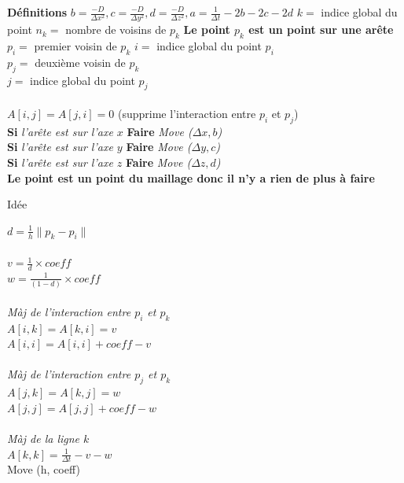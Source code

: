 \documentclass[11pt,a4paper]{article}
\begin{document}
\begin{algorithm}[H]
\SetAlgoLined
\textbf{Définitions}\;
$\displaystyle b =\frac{-D}{\Delta x^2}, c=\frac{-D}{\Delta y^2}, d=\frac{-D}{\Delta z^2}, a = \frac{1}{\Delta t} -2b-2c-2d$\;
{
	$k =$ indice global du point\;
	$n_k =$ nombre de voisins de $p_k$\;
	{
		\textbf{Le point $p_k$ est un point sur une arête}\;
		$p_i = $ premier voisin de $p_k$\;
		$i =$ indice global du point $p_i$\\
		$p_j = $ deuxième voisin de $p_k$\\
		$j =$ indice global du point $p_j$\\
		~\\
		$A [i,j] = A [j,i] = 0$ (supprime l'interaction entre $p_i$ et $p_j$)\\
		\textbf{Si }\textit{l'arête est sur l'axe $x$ }\textbf{Faire }\textit{Move ($\Delta x, b$)}\\
		\textbf{Si }\textit{l'arête est sur l'axe $y$ }\textbf{Faire }\textit{Move ($\Delta y, c$)}\\
		\textbf{Si }\textit{l'arête est sur l'axe $z$ }\textbf{Faire }\textit{Move ($\Delta z, d$)}\\
	}
	{
		\textbf{Le point est un point du maillage donc il n'y a rien de plus à faire}\\
	}
}
\caption{Idée}
\end{algorithm}

\begin{algorithm}[H]
\SetAlgoLined
$d = \frac{1}{h}\|p_k-p_i\|$\\
~\\
$v = \frac{1}{d} \times coeff$\\
$w = \frac{1}{(1-d)} \times coeff$\\
~\\
\textit{Màj de l'interaction entre $p_i$ et $p_k$}\\
$A [i, k] = A [k, i] = v$\\
$A [i, i] = A [i, i] + coeff - v$\\
~\\
\textit{Màj de l'interaction entre $p_j$ et $p_k$}\\
$A [j, k] = A [k, j] = w$\\
$A [j, j] = A [j, j] + coeff -  w$\\
~\\
\textit{Màj de la ligne $k$}\\
$A [k,k] = \frac{1}{\Delta t} - v - w$\\
\caption{Move (h, coeff)}
\end{algorithm}
\end{document}
